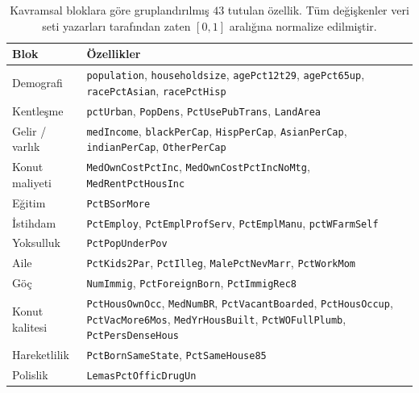 \documentclass{ieeeaccess}
\begin{document}
\begin{table}[!t]
\caption{Kavramsal bloklara göre gruplandırılmış $43$ tutulan özellik. Tüm değişkenler veri seti yazarları tarafından zaten $[0,1]$ aralığına normalize edilmiştir.}
\label{tab:features}
\centering
\footnotesize
\begin{tabular}{p{1.7cm}p{5.9cm}}
\toprule
Blok & Özellikler \\
\midrule
Demografi       & \texttt{population}, \texttt{householdsize}, \texttt{agePct12t29}, \texttt{agePct65up}, \texttt{racePctAsian}, \texttt{racePctHisp} \\
Kentleşme       & \texttt{pctUrban}, \texttt{PopDens}, \texttt{PctUsePubTrans}, \texttt{LandArea} \\
Gelir / varlık  & \texttt{medIncome}, \texttt{blackPerCap}, \texttt{HispPerCap}, \texttt{AsianPerCap}, \texttt{indianPerCap}, \texttt{OtherPerCap} \\
Konut maliyeti  & \texttt{MedOwnCostPctInc}, \texttt{MedOwnCostPctIncNoMtg}, \texttt{MedRentPctHousInc} \\
Eğitim          & \texttt{PctBSorMore} \\
İstihdam        & \texttt{PctEmploy}, \texttt{PctEmplProfServ}, \texttt{PctEmplManu}, \texttt{pctWFarmSelf} \\
Yoksulluk       & \texttt{PctPopUnderPov} \\
Aile            & \texttt{PctKids2Par}, \texttt{PctIlleg}, \texttt{MalePctNevMarr}, \texttt{PctWorkMom} \\
Göç             & \texttt{NumImmig}, \texttt{PctForeignBorn}, \texttt{PctImmigRec8} \\
Konut kalitesi  & \texttt{PctHousOwnOcc}, \texttt{MedNumBR}, \texttt{PctVacantBoarded}, \texttt{PctHousOccup}, \texttt{PctVacMore6Mos}, \texttt{MedYrHousBuilt}, \texttt{PctWOFullPlumb}, \texttt{PctPersDenseHous} \\
Hareketlilik    & \texttt{PctBornSameState}, \texttt{PctSameHouse85} \\
Polislik        & \texttt{LemasPctOfficDrugUn} \\
\bottomrule
\end{tabular}
\end{table}

\end{document}
